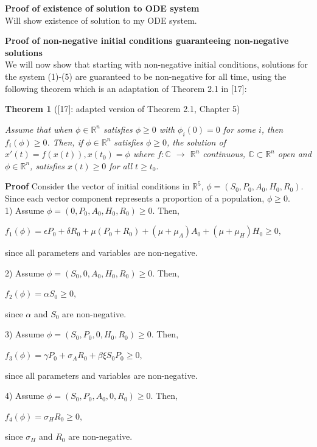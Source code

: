 \documentclass[12pt]{article}
\begin{document}
 \textbf{Proof of existence of solution to ODE system} \\
Will show existence of solution to my ODE system. 


\textbf{Proof of non-negative initial conditions guaranteeing non-negative solutions} \\
We will now show that starting with non-negative initial conditions, solutions for the system (1)-(5) are guaranteed to be non-negative for all time, using the following theorem which is an adaptation of Theorem 2.1 in [17]: 
 
 \textbf{Theorem 1} ([17]: adapted version of Theorem 2.1, Chapter 5) 

 \textit{Assume that when $\phi \in \mathbb{R}^n$ satisfies $\phi \geq 0$ with $\phi_{i}(0)=0$ for some $i$, then $f_i(\phi) \geq 0$. Then, if $\phi \in \mathbb{R}^n$ satisfies $\phi \geq 0$, the solution of $x'(t)=f(x(t)), x(t_{0})=\phi$ where $f: \mathbb{C}$ $\rightarrow$ $\mathbb{R}^n$ continuous, $\mathbb{C} \subset \mathbb{R}^n$ open and $\phi \in \mathbb{R}^n$, satisfies $x(t) \geq 0$ for all $t \geq t_{0}.$}
 
 \textbf{Proof} Consider the vector of initial conditions in $\mathbb{R}^5$, $\phi = (S_0, P_0, A_0, H_0, R_0).$ Since each vector component represents a proportion of a population, $\phi \geq 0.$ \\
 
1) Assume $\phi = (0, P_0, A_0, H_0, R_0) \geq 0.$ Then, 
\begin{center}
$f_1(\phi)=\epsilon P_0 +\delta R_0 + \mu (P_0+R_0)+(\mu + \mu_A) A_0 + (\mu+\mu_H) H_0 \geq 0,$
\end{center}
since all parameters and variables are non-negative. 
 
2) Assume $\phi = (S_0, 0, A_0, H_0, R_0) \geq 0.$ Then, 
\begin{center}
$f_2(\phi)=\alpha S_0 \geq 0,$
\end{center}
since $\alpha$ and $S_0$ are non-negative. 

3) Assume $\phi = (S_0, P_0, 0, H_0, R_0) \geq 0.$ Then,
\begin{center}
$f_3(\phi)=\gamma P_0 +\sigma_A R_0 + \beta \xi S_0 P_0 \geq 0,$
\end{center}
since all parameters and variables are non-negative. 
 
4) Assume $\phi = (S_0, P_0, A_0, 0, R_0) \geq 0.$ Then,
\begin{center}
$f_4(\phi)=\sigma_H R_0 \geq 0,$
\end{center}
since $\sigma_H$ and $R_0$ are non-negative. 
 
\end{document}
